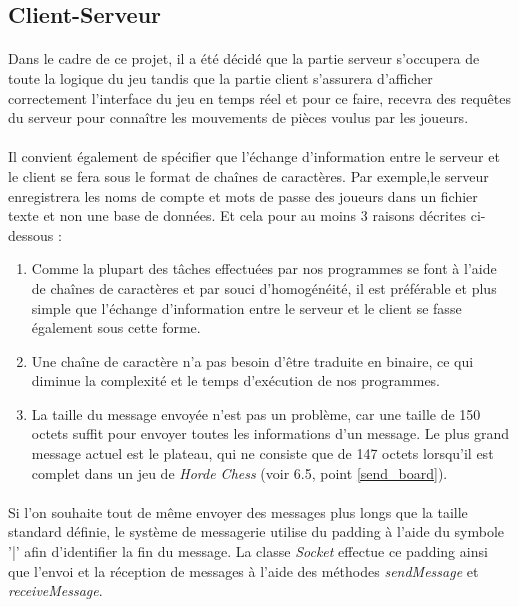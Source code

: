 \documentclass[10pt, a4paper]{article}
\begin{document}
\subsection{Client-Serveur}
\paragraph{}Dans le cadre de ce projet, il a été décidé que la partie serveur s'occupera de toute la logique du jeu tandis que la partie client s'assurera d'afficher correctement l'interface du jeu en temps réel et pour ce faire, recevra des requêtes du serveur pour connaître les mouvements de pièces voulus par les joueurs.
\paragraph{}Il convient également de spécifier que l'échange d'information entre le serveur et le client se fera sous le format de chaînes de caractères. Par exemple,le serveur enregistrera les noms de compte et mots de passe des joueurs dans un fichier texte et non une base de données. Et cela pour au moins 3 raisons décrites ci-dessous :
\begin{enumerate}
\item Comme la plupart des tâches effectuées par nos programmes se font à l'aide de chaînes de caractères et par souci d'homogénéité, il est préférable et plus simple que l'échange d'information entre le serveur et le client se fasse également sous cette forme.
\item Une chaîne de caractère n'a pas besoin d'être traduite en binaire, ce qui diminue la complexité et le temps d'exécution de nos programmes.
\item La taille du message envoyée n'est pas un problème, car une taille de 150 octets suffit pour envoyer toutes les informations d'un message. Le plus grand message actuel est le plateau, qui ne consiste que de 147 octets lorsqu'il est complet dans un jeu de \textit{Horde Chess} (voir 6.5, point \ref{send_board}).
\end{enumerate}
\paragraph{}Si l'on souhaite tout de même envoyer des messages plus longs que la taille standard définie, le système de messagerie utilise du padding à l'aide du symbole '|' afin d'identifier la fin du message. La classe \textit{Socket} effectue ce padding ainsi que l'envoi et la réception de messages à l'aide des méthodes \textit{sendMessage} et \textit{receiveMessage}.
\end{document}

